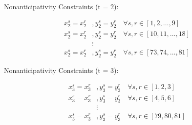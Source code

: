 \documentclass{article}
\begin{document}
\par
Nonanticipativity Constraints (t = 2):

\begin{align*}
        x_{2}^{s} = x_{2}^{r}&, y_{2}^{s} = y_{2}^{r} \quad \forall s, r \in [1, 2, \ldots, 9]\\
        x_{2}^{s} = x_{2}^{r}&, y_{2}^{s} = y_{2}^{r} \quad \forall s, r \in [10, 11, \ldots, 18]\\
        &\vdots\\
        x_{2}^{s} = x_{2}^{r}&, y_{2}^{s} = y_{2}^{r} \quad \forall s, r \in [73, 74, \ldots, 81]
\end{align*}

\par
Nonanticipativity Constraints (t = 3):

\begin{align*}
        x_{3}^{s} = x_{3}^{r}&, y_{3}^{s} = y_{3}^{r} \quad \forall s, r \in [1, 2, 3]\\
        x_{3}^{s} = x_{3}^{r}&, y_{3}^{s} = y_{3}^{r} \quad \forall s, r \in [4, 5, 6]\\
        &\vdots\\
        x_{3}^{s} = x_{3}^{r}&, y_{3}^{s} = y_{3}^{r} \quad \forall s, r \in [79, 80, 81]
\end{align*}
\end{document}
